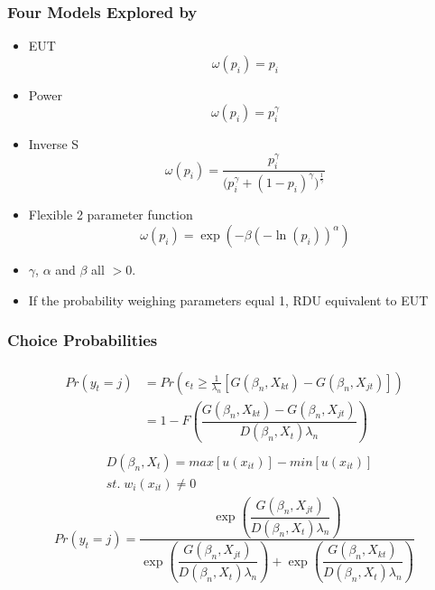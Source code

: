 \documentclass{beamer}
\newcommand\Prob{\ensuremath{\mathit{Pr}}}  %
\begin{document}
\begin{frame}
\frametitle{Four Models Explored by \textcite{Harrison2016}}
\begin{itemize}
	\item EUT
		\begin{equation}
			\label{eq4:pw:eut}
			\omega(p_i) = p_i
		\end{equation}
	\item Power \parencite{Quiggin1982}
		\begin{equation}
			\label{eq4:pw:pow}
			\omega(p_i)=p_i^\gamma
		\end{equation}
	\item Inverse S \parencite{Kahneman1979}
		\begin{equation}
			\label{eq4:pw:inv}
			\omega(p_i) = \frac{p_i^\gamma}{\biggl(p_i^\gamma + {(1-p_i)}^\gamma\biggr)^{ \frac{1}{\gamma} } }
		\end{equation}
	\item Flexible 2 parameter function \parencite{Prelec1998}
		\begin{equation}
			\label{eq4:pw:pre}
			\omega(p_i)=\exp(-\beta(-\ln(p_i))^\alpha)
		\end{equation}

	\item $\gamma$, $\alpha$ and $\beta$ all $> 0$.
	\item If the probability weighing parameters equal 1, RDU equivalent to EUT

\end{itemize}
\end{frame}

\begin{frame}
\frametitle{Choice Probabilities}
\begin{align}
	\label{eq4:RE.2}
	\begin{split}
		{\Prob}(y_t = j) &= {\Prob}\left(  \epsilon_t \geq \frac{1}{\lambda_n} \left[ G(\beta_n,X_{kt}) - G(\beta_n,X_{jt}) \right] \right)\\
		&= 1 - F\left( \dfrac{G(\beta_n,X_{kt}) - G(\beta_n,X_{jt})}{D(\beta_n,X_t)\lambda_n }  \right)
	\end{split}
\end{align}
\begin{align}
	\label{eq4:W.cu}
	\begin{split}
		&D(\beta_n,X_t) = \mathit{max}[u(x_{it})] - \mathit{min}[u(x_{it})]\\
		&\mathit{st.}\; w_i(x_{it}) \neq 0
	\end{split}
\end{align}
\begin{equation}
	\label{eq4:RE.f}
	{\Prob}(y_t=j) =\dfrac{\exp\!\left( \dfrac{ G(\beta_n,X_{jt}) }{ D(\beta_n,X_{t})\lambda_n }  \right)}{  \exp\!\left( \dfrac{ G(\beta_n,X_{jt}) }{ D(\beta_n,X_{t})\lambda_n }  \right) + \exp\!\left( \dfrac{ G(\beta_n,X_{kt}) }{ D(\beta_n,X_{t})\lambda_n }  \right)    }
\end{equation}

\end{frame}
\end{document}
